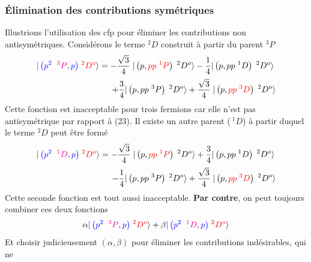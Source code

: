 \subsubsection{Élimination des contributions symétriques}
Illustrions l'utilisation des cfp pour éliminer les contributions non antisymétriques. Considérons
le terme $^2D$ construit à partir du parent $^3P$
\begin{equation}
\begin{array}{l}
\DS {\color{blue}
\vert \left( p^{2} \; \; {\color{magenta} ^3P}, p \right)  }
\;  {\color{red} ^2D^o}
 \rangle 
= 
- \frac{\sqrt{3}}{4} \; 
\vert \left( p, {\color{red} pp  \; ^1P } \right) \; ^2D^o \rangle
 - \frac{1}{4}  
\vert \left( p, pp  \; ^1D \right) \; ^2D^o \rangle\vspace{2mm}\\ \DS
\qquad\qquad\qquad\qquad\quad+ \frac{3}{4}  
\vert \left( p, pp  \; ^3P \right) \; ^2D^o \rangle 
+ \frac{\sqrt{3}}{4} \; 
\vert \left( p, {\color{red} pp  \; ^3D } \right) \; ^2D^o \rangle 
\end{array}
\end{equation}
Cette fonction est inacceptable pour trois fermions car elle n'est pas antisymétrique
par rapport à (23). Il existe un autre parent ($\ ^1D$) à partir duquel le terme $^2D$ peut être
formé
\begin{equation}
\begin{array}{l}
\DS{\color{blue}
\vert \left( p^{2} \; \; {\color{magenta} ^1D}, p \right)  }\;  {\color{red} ^2D^o}
 \rangle 
= 
- \frac{\sqrt{3}}{4} \; 
\vert \left( p, {\color{red} pp  \; ^1P}  \right) \; ^2D^o \rangle
 + \frac{3}{4}  
\vert \left( p, pp  \; ^1D \right) \; ^2D^o \rangle\vspace{2mm}\\
\DS\qquad\qquad\qquad\qquad\quad - \frac{1}{4}  
\vert \left( p, pp  \; ^3P \right) \; ^2D^o \rangle 
+ \frac{\sqrt{3}}{4} \; 
\vert \left( p, { \color{red} pp  \; ^3D } \right) \; ^2D^o \rangle
\end{array}
\end{equation}
Cette seconde fonction est tout aussi inacceptable. \textbf{Par contre}, on peut toujours combiner
ces deux fonctions 
\begin{equation}
\alpha  {\color{blue}
\vert \left( p^{2} \; \; {\color{magenta} ^3P}, p \right)  }
\;  {\color{red} ^2D^o}
 \rangle 
+ \beta {\color{blue}
\vert \left( p^{2} \; \; {\color{magenta} ^1D}, p \right)  }
\;  {\color{red} ^2D^o}
 \rangle
\end{equation}
Et choisir judicieusement $(\alpha,\beta)$ pour éliminer les contributions indésirables, qui ne
